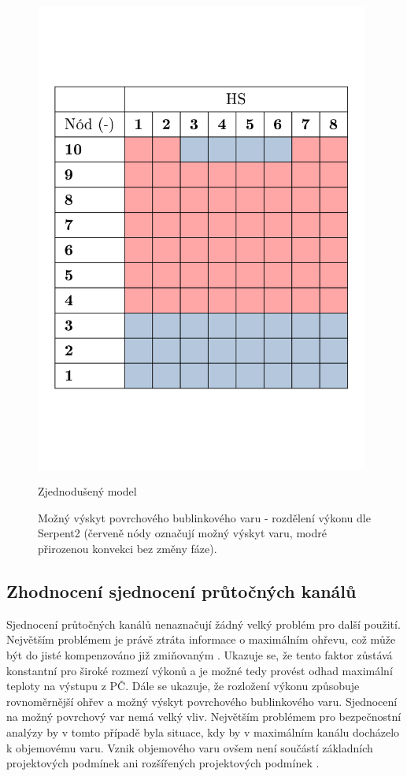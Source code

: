 \begin{figure}[H]
\begin{minipage}{.5\textwidth}
		\includegraphics[width=0.98\textwidth, trim={0.5cm 4cm 0cm 5cm}, clip]{./04_TH_model_IRT/grafy/var_serpent_jedno.pdf}
		\caption{Zjednodušený model}
		\label{fig:var_jedno_serpent}
	\end{minipage}
	\caption{Možný výskyt povrchového bublinkového varu - rozdělení výkonu dle Serpent2 (červeně nódy označují možný výskyt varu, modré přirozenou konvekci bez změny fáze).}
	\label{fig:var_serpent}
\end{figure}
\subsection{Zhodnocení sjednocení průtočných kanálů}
\label{subsec:nat_conv_zaver}
Sjednocení průtočných kanálů nenaznačují žádný velký problém pro další použití. Největším problémem je právě ztráta informace o maximálním ohřevu, což může být do jisté kompenzováno již zmiňovaným . Ukazuje se, že tento faktor zůstává konstantní pro široké rozmezí výkonů a je možné tedy provést odhad maximální teploty na výstupu z PČ. Dále se ukazuje, že rozložení výkonu způsobuje rovnoměrnější ohřev a možný výskyt povrchového bublinkového varu. Sjednocení na možný povrchový var nemá velký vliv. Největším problémem pro bezpečnostní analýzy by v tomto případě byla situace, kdy by v maximálním kanálu docházelo k objemovému varu. Vznik objemového varu ovšem není součástí základních projektových podmínek ani rozšířených projektových podmínek \cite{fejt, rataj_bezpecnosti_zprava_VR_1}.



